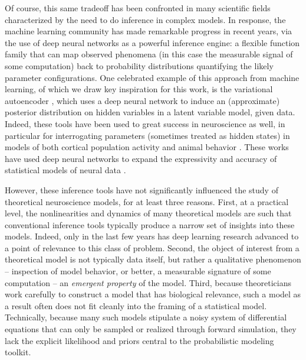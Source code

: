 \documentclass[11pt]{article}
\begin{document}
Of course, this same tradeoff has been confronted in many scientific fields characterized by the need to do inference in complex models.  
In response, the machine learning community has made remarkable progress in recent years, via the use of deep neural networks as a powerful inference engine: a flexible function family that can map observed phenomena (in this case the measurable signal of some computation) back to probability distributions quantifying the likely parameter configurations.  
One celebrated example of this approach from machine learning, of which we draw key inspiration for this work, is the variational autoencoder \cite{kingma2013auto, rezende2014stochastic}, which uses a deep neural network to induce an (approximate) posterior distribution on hidden variables in a latent variable model, given data. 
Indeed, these tools have been used to great success in neuroscience as well, in particular for interrogating parameters (sometimes treated as hidden states) in models of both cortical population activity \cite{gao2016linear, zhao2017recursive, barello2018sparse, pandarinath2018inferring} and animal behavior \cite{wiltschko2015mapping, johnson2016composing, batty2019behavenet}. 
These works have used deep neural networks to expand the expressivity and accuracy of statistical models of neural data \cite{paninski2018neural}. 

However, these inference tools have not significantly influenced the study of theoretical neuroscience models, for at least three reasons.  
First, at a practical level, the nonlinearities and dynamics of many theoretical models are such that conventional inference tools typically produce a narrow set of insights into these models.  
Indeed, only in the last few years has deep learning research advanced to a point of relevance to this class of problem.
Second, the object of interest from a theoretical model is not typically data itself, but rather a qualitative phenomenon -- inspection of model behavior, or better, a measurable signature of some computation -- an \emph{emergent property} of the model.  
Third, because theoreticians work carefully to construct a model that has biological relevance, such a model as a result often does not fit cleanly into the framing of a statistical model. 
Technically, because many such models stipulate a noisy system of differential equations that can only be sampled or realized through forward simulation, they lack the explicit likelihood and priors central to the probabilistic modeling toolkit.
\end{document}
